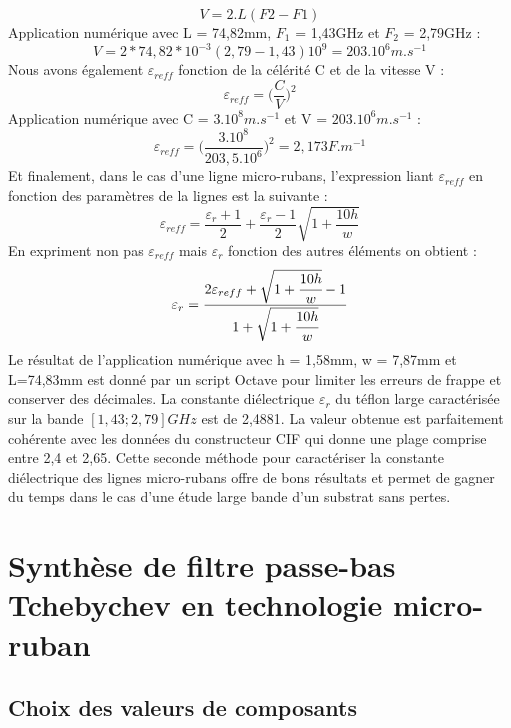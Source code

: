\documentclass[french]{article}
\begin{document}
\begin{equation}
V=2.L(F2-F1) 
\end{equation}
Application numérique avec L = 74,82mm, $F_1$ = 1,43GHz et $F_2$ = 2,79GHz :
\begin{equation}
V= 2*74,82*10^{-3}(2,79-1,43)10^9=203.10^6m.s^{-1}
\end{equation}
Nous avons également $\varepsilon_{reff}$ fonction de la célérité C et de la vitesse V :
\begin{equation}
\varepsilon_{reff} = \Big(\frac{C}{V}\Big)^2
\end{equation}
Application numérique avec C = $3.10^8m.s^{-1}$ et V = $203.10^6m.s^{-1}$ :
\begin{equation}
\varepsilon_{reff} = \Big(\frac{3.10^8}{203,5.10^6}\Big)^2=2,173 F.m^{-1}
\end{equation}
Et finalement, dans le cas d'une ligne micro-rubans, l'expression liant $\varepsilon_{reff}$ en fonction des paramètres de la lignes est la suivante :
\begin{equation}
	\varepsilon_{reff} = \frac{\varepsilon_r+1}{2}+\frac{\varepsilon_r-1}{2}\sqrt{1+\frac{10h}{w}}
\end{equation}
En expriment non pas $\varepsilon_{reff}$ mais $\varepsilon_{r}$ fonction des autres éléments on obtient : 
\begin{equation}
\varepsilon_{r} = \frac{2\varepsilon_{reff} + \sqrt{1 + \cfrac{10h}{w}} - 1}{1 + \sqrt{1 + \cfrac{10h}{w}}}
\end{equation}
Le résultat de l'application numérique avec h = 1,58mm, w = 7,87mm et L=74,83mm est donné par un script Octave pour limiter les erreurs de frappe et conserver des décimales. La constante diélectrique $\varepsilon_{r}$ du téflon large caractérisée sur la bande $[1,43;2,79]GHz$ est de 2,4881. La valeur obtenue est parfaitement cohérente avec les données du constructeur CIF qui donne une plage comprise entre 2,4 et 2,65. Cette seconde méthode pour caractériser la constante diélectrique des lignes micro-rubans offre de bons résultats et permet de gagner du temps dans le cas d'une étude large bande d'un substrat sans pertes.


\newpage

\section{Synthèse de filtre passe-bas Tchebychev en technologie micro-ruban}

\subsection{Choix des valeurs de composants}
\end{document}
